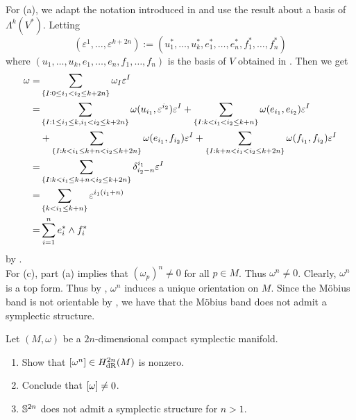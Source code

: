 \begin{solution}
For (a), we adapt the notation introduced in \cite[351--354]{lee:smooth_manifolds:2013} and use the result about a basis of $\Lambda^k(V^*)$. Letting 
\begin{equation*}
(\varepsilon^1, \dots, \varepsilon^{k + 2n}) := (u^*_1,\dots,u^*_k,e^*_1,\dots,e^*_n,f^*_1,\dots,f^*_n)
\end{equation*}
\noindent where $(u_1,\dots,u_k,e_1,\dots,e_n,f_1,\dots,f_n)$ is the basis of $V$ obtained in \cite[3]{dasilva:symplectic:2008}. Then we get
\begin{align*}
\omega =& \sum_{\cbr[0]{I : 0 \leq i_1 < i_2 \leq k + 2n}} \omega_I\varepsilon^I\\
=& \sum_{\cbr[0]{I : 1 \leq i_1 \leq k, i_1 < i_2 \leq k + 2n}} \omega(u_{i_1},\varepsilon^{i_2})\varepsilon^I + \sum_{\cbr[0]{I : k < i_1 < i_2 \leq k + n}}\omega(e_{i_1},e_{i_2})\varepsilon^I\\
&+ \sum_{\cbr[0]{I : k < i_1 \leq k + n < i_2 \leq k + 2n}}\omega(e_{i_1},f_{i_2})\varepsilon^I + \sum_{\cbr[0]{I : k + n < i_1 < i_2 \leq k + 2n}}\omega(f_{i_1},f_{i_2})\varepsilon^I\\
=& \sum_{\cbr[0]{I : k < i_1 \leq k + n < i_2 \leq k + 2n}}\delta^{i_1}_{i_2 - n}\varepsilon^I\\
=& \sum_{\cbr[0]{k < i_1 \leq k + n}} \varepsilon^{i_1(i_1 + n)}\\
=& \sum_{i = 1}^n e^*_i \wedge f^*_i
\end{align*}
\noindent by \cite[356]{lee:smooth_manifolds:2013}.\\
For (c), part (a) implies that $(\omega_p)^n \neq 0$ for all $p \in M$. Thus $\omega^n \neq 0$. Clearly, $\omega^n$ is a top form. Thus by \cite[381]{lee:smooth_manifolds:2013}, $\omega^n$ induces a unique orientation on $M$. Since the M\"obius band is not orientable by \cite[393]{lee:smooth_manifolds:2013}, we have that the M\"obius band does not admit a symplectic structure.
\end{solution}

\begin{exercise}
Let $(M,\omega)$ be a $2n$-dimensional compact symplectic manifold. 
\begin{enumerate}[label = \textup{(}\alph*\textup{)}]
\item Show that $\sbr[0]{\omega^n} \in H_{\dRrm}^{2n}(M)$ is nonzero.
\item Conclude that $\sbr[0]{\omega} \neq 0$.
\item $\mathbb{S}^{2n}$ does not admit a symplectic structure for $n > 1$.
\end{enumerate}
\end{exercise}

